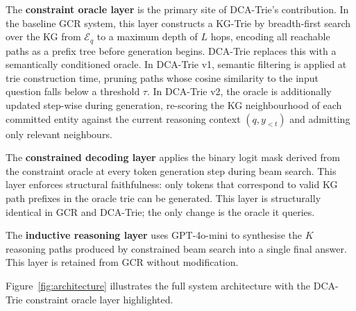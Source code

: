 The \textbf{constraint oracle layer} is the primary site of DCA-Trie's contribution. In the baseline GCR system, this layer constructs a KG-Trie by breadth-first search over the KG from $\mathcal{E}_q$ to a maximum depth of $L$ hops, encoding all reachable paths as a prefix tree before generation begins. DCA-Trie replaces this with a semantically conditioned oracle. In DCA-Trie v1, semantic filtering is applied at trie construction time, pruning paths whose cosine similarity to the input question falls below a threshold $\tau$. In DCA-Trie v2, the oracle is additionally updated step-wise during generation, re-scoring the KG neighbourhood of each committed entity against the current reasoning context $(q, y_{<t})$ and admitting only relevant neighbours.

The \textbf{constrained decoding layer} applies the binary logit mask derived from the constraint oracle at every token generation step during beam search. This layer enforces structural faithfulness: only tokens that correspond to valid KG path prefixes in the oracle trie can be generated. This layer is structurally identical in GCR and DCA-Trie; the only change is the oracle it queries.

The \textbf{inductive reasoning layer} uses GPT-4o-mini to synthesise the $K$ reasoning paths produced by constrained beam search into a single final answer. This layer is retained from GCR without modification.

Figure~\ref{fig:architecture} illustrates the full system architecture with the DCA-Trie constraint oracle layer highlighted.

